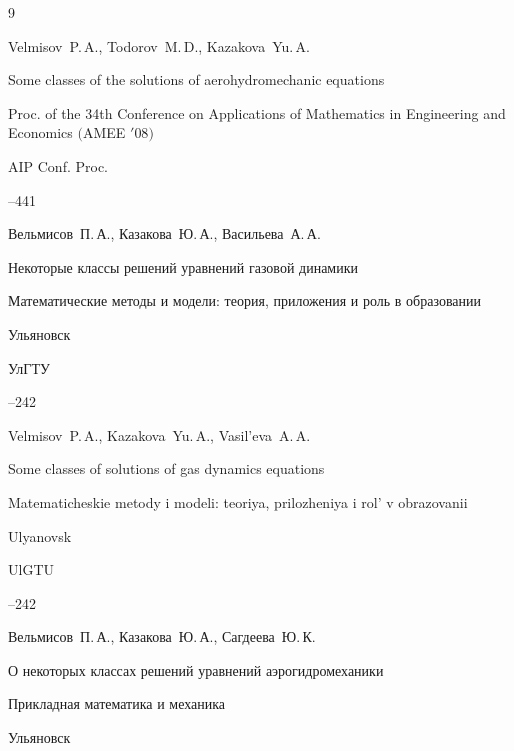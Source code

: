 \begin{thebibliography}{9}




\by Velmisov~P.\,A., Todorov~M.\,D., Kazakova~Yu.\,A.

\paper Some classes of the solutions of aerohydro\-me\-chanic equations

\paperinfo Proc. of the 34th Conference on Applications of Mathe\-ma\-tics in Engineering and Economics $($AMEE $'08)$

\jour AIP Conf. Proc.




--441




\by Вельмисов~П.\,А., Казакова~Ю.\,А., Васильева~А.\,А.

\paper Некоторые классы решений уравнений газовой динамики

\inbook Математические методы и модели: теория, приложения и роль в образовании

\publaddr Ульяновск

\publ УлГТУ


--242

\misctransl

\by Velmisov~P.\,A., Kazakova~Yu.\,A., Vasil'eva~A.\,A.

\paper Some classes of solutions of gas dynamics equations

\inbook Matematicheskie metody i modeli: teoriya, prilozheniya i rol' v obrazovanii

\publaddr Ulyanovsk

\publ UlGTU


--242








\by Вельмисов~П.\,А., Казакова~Ю.\,А., Сагдеева~Ю.\,К.

\paper О некоторых классах решений уравнений аэрогидромеханики

\inbook Прикладная математика и механика

\publaddr Ульяновск


\end{thebibliography}
